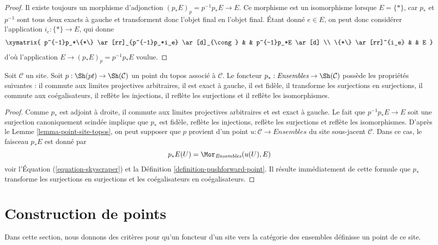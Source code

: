 \begin{proof}
Il existe toujours un morphisme d’adjonction
$(p_*E)_p = p^{-1}p_*E \to E$.
Ce morphisme est un isomorphisme lorsque $E = \{*\}$, car $p_*$ et $p^{-1}$
sont tous deux exacts à gauche et transforment donc l’objet final en l’objet
final. Étant donné $e \in E$, on peut donc considérer l’application
$i_e : \{*\} \to E$, qui donne
$$
\xymatrix{
p^{-1}p_*\{*\} \ar[rr]_{p^{-1}p_*i_e} \ar[d]_{\cong} & & p^{-1}p_*E \ar[d] \\
\{*\} \ar[rr]^{i_e} & & E
}
$$
d’où l’application $E \to (p_*E)_p = p^{-1}p_*E$ voulue.
\end{proof}

\begin{lemma}
\label{lemma-skyscraper-functor-exact}
Soit $\mathcal{C}$ un site. Soit
$p : \Sh(pt) \to \Sh(\mathcal{C})$ un point du topos associé à
$\mathcal{C}$. Le foncteur $p_* : \textit{Ensembles} \to \Sh(\mathcal{C})$
possède les propriétés suivantes : il commute aux limites projectives
arbitraires, il est exact à gauche, il est fidèle, il transforme les
surjections en surjections, il commute aux coégalisateurs, il reflète les
injections, il reflète les surjections et il reflète les isomorphismes.
\end{lemma}

\begin{proof}
Comme $p_*$ est adjoint à droite, il commute aux limites projectives
arbitraires et est exact à gauche. Le fait que
$p^{-1}p_*E \to E$ soit une surjection canoniquement scindée implique que
$p_*$ est fidèle, reflète les injections, reflète les surjections et reflète
les isomorphismes. D’après le Lemme \ref{lemma-point-site-topos}, on peut
supposer que $p$ provient d’un point
$u : \mathcal{C} \to \textit{Ensembles}$ du site sous-jacent $\mathcal{C}$.
Dans ce cas, le faisceau $p_*E$ est donné par
$$
p_*E(U) = \Mor_{\textit{Ensembles}}(u(U), E)
$$
voir l’Équation (\ref{equation-skyscraper}) et la
Définition \ref{definition-pushforward-point}.
Il résulte immédiatement de cette formule que $p_*$ transforme les
surjections en surjections et les coégalisateurs en coégalisateurs.
\end{proof}



\section{Construction de points}
\label{section-construct-points}

\noindent
Dans cette section, nous donnons des critères pour qu’un foncteur
d’un site vers la catégorie des ensembles définisse un point de ce site.

